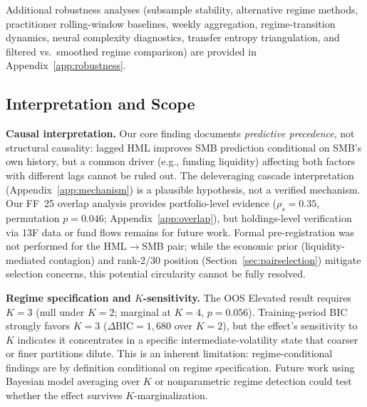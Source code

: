 \documentclass[sigconf,anonymous]{acmart}
\begin{document}
Additional robustness analyses (subsample stability, alternative regime methods, practitioner rolling-window baselines, weekly aggregation, regime-transition dynamics, neural complexity diagnostics, transfer entropy triangulation, and filtered vs.\ smoothed regime comparison) are provided in Appendix~\ref{app:robustness}.

\subsection{Interpretation and Scope}
\label{sec:limitations}

\textbf{Causal interpretation.}
Our core finding documents \emph{predictive precedence}, not structural causality:
lagged HML improves SMB prediction conditional on SMB's own history, but a common
driver (e.g., funding liquidity) affecting both factors with different lags cannot
be ruled out. The deleveraging cascade interpretation
(Appendix~\ref{app:mechanism}) is a plausible hypothesis, not a verified mechanism.
Our FF~25 overlap analysis provides portfolio-level evidence
($\rho_s = 0.35$, permutation $p = 0.046$; Appendix~\ref{app:overlap}),
but holdings-level verification via 13F data or fund flows remains for future work.
Formal pre-registration was not performed for the HML$\to$SMB pair;
while the economic prior (liquidity-mediated contagion) and rank-2/30
position (Section~\ref{sec:pairselection}) mitigate selection concerns,
this potential circularity cannot be fully resolved.

\textbf{Regime specification and $K$-sensitivity.}
The OOS Elevated result requires $K = 3$ (null under $K = 2$; marginal at $K = 4$,
$p = 0.056$). Training-period BIC strongly favors $K = 3$ ($\Delta\text{BIC} = 1{,}680$
over $K = 2$), but the effect's sensitivity to $K$ indicates it concentrates in
a specific intermediate-volatility state that coarser or finer partitions dilute.
This is an inherent limitation: regime-conditional findings are by definition
conditional on regime specification. Future work using Bayesian model averaging
over $K$ or nonparametric regime detection could test whether the effect
survives $K$-marginalization.
\end{document}
